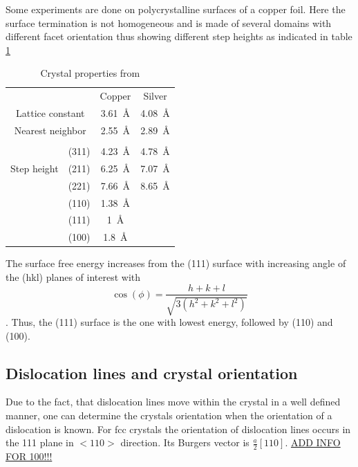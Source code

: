 Some experiments are done on polycrystalline surfaces of a copper foil. Here the surface termination is not homogeneous and is made of several domains with different facet orientation thus showing different step heights as indicated in table \ref{tab:step-heights}
\begin{table}\centering
\caption{Crystal properties from \cite[29ff]{riemann_ionic_2002, ma_interplay_2016, liu_oxygen_2014}}
\label{tab:step-heights}

\begin{tabular}{cccc}
			&				& Copper 	 & Silver \\
\multicolumn{2}{c}{Lattice constant}			& \SI{3.61}{\angstrom} & \SI{4.08}{\angstrom} \\
\multicolumn{2}{c}{Nearest neighbor}			& \SI{2.55}{\angstrom} & \SI{2.89}{\angstrom} \\ \hline \\
\multirow{3}{*}{Step height}	& (311) & \SI{4.23}{\angstrom} & \SI{4.78}{\angstrom} \\
								& (211) & \SI{6.25}{\angstrom} & \SI{7.07}{\angstrom} \\
								& (221) & \SI{7.66}{\angstrom} & \SI{8.65}{\angstrom} \\
								& (110) & \SI{1.38}{\angstrom} & \\
								& (111) & \SI{1}{\angstrom} & \\
								& (100) & \SI{1.8}{\angstrom} & \\

\end{tabular}
\end{table}

The surface free energy increases from the (111) surface with increasing angle of the (hkl) planes of interest with $$\cos(\phi)=\frac{h+k+l}{\sqrt{3(h^2+k^2+l^2)}}$$ \cite{jian-min_calculation_2004}. Thus, the (111) surface is the one with lowest energy, followed by (110) and (100).

\subsection{Dislocation lines and crystal orientation}
Due to the fact, that dislocation lines move within the crystal in a well defined manner, one can determine the crystals orientation when the orientation of a dislocation is known.
For fcc crystals the orientation of dislocation lines occurs in the {111} plane in $<110>$ direction. Its Burgers vector is $\frac{a}{2}[110]$\cite{_dislocation-theory}. \underline{ADD INFO	FOR 100!!!}